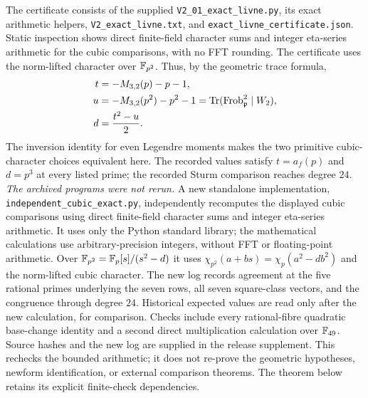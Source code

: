 The certificate consists of the supplied
\texttt{V2\_01\_exact\_livne.py}, its exact arithmetic helpers,
\texttt{V2\_exact\_livne.txt}, and
\texttt{exact\_livne\_certificate.json}. Static inspection shows direct
finite-field character sums and integer eta-series arithmetic for the
cubic comparisons, with no FFT rounding. The certificate uses the
norm-lifted character over $\mathbb F_{p^2}$. Thus, by the geometric trace
formula,
\begin{align*}
 t&=-M_{3,2}(p)-p-1,\\
 u&=-M_{3,2}(p^2)-p^2-1=\operatorname{Tr}(\operatorname{Frob}_{\mathfrak p}^{2}\mid W_2),\\
 d&=\frac{t^2-u}{2}.
\end{align*}
The inversion identity for even Legendre moments makes the two
primitive cubic-character choices equivalent here. The recorded
values satisfy $t=a_f(p)$ and $d=p^3$ at every listed prime; the
recorded Sturm comparison reaches degree $24$.
\emph{The archived programs were not rerun.} A new standalone implementation,
\texttt{independent\_cubic\_exact.py}, independently recomputes the
displayed cubic comparisons using direct finite-field character sums and
integer eta-series arithmetic. It uses only the Python standard library;
the mathematical calculations use arbitrary-precision integers, without
FFT or floating-point arithmetic. Over $\mathbb F_{p^2}=\mathbb F_p[s]/(s^2-d)$ it uses
$\chi_{p^2}(a+bs)=\chi_p(a^2-db^2)$ and the norm-lifted cubic character.
The new log records agreement at the five rational primes underlying the
seven rows, all seven square-class vectors, and the congruence through
degree $24$. Historical expected values are read only after the new
calculation, for comparison. Checks include every rational-fibre quadratic
base-change identity and a second direct multiplication calculation over
$\mathbb F_{49}$. Source hashes and the new log are supplied in the release
supplement. This rechecks the bounded arithmetic; it does not re-prove the
geometric hypotheses, newform identification, or external comparison
theorems. The theorem below retains its explicit finite-check dependencies.

